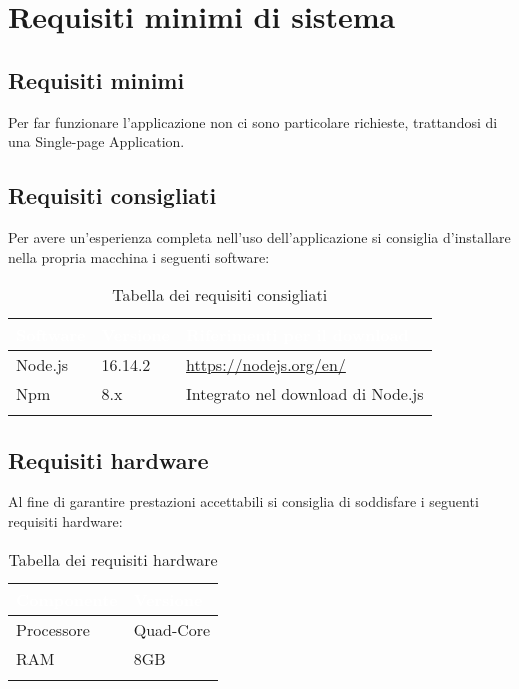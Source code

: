\chapter{Requisiti minimi di sistema}
\section{Requisiti minimi}
    Per far funzionare l'applicazione non ci sono particolare richieste, trattandosi di una Single-page Application.

\section{Requisiti consigliati}
    Per avere un'esperienza completa nell'uso dell'applicazione si consiglia d'installare nella propria macchina i seguenti software:
    \begin{longtable}{|p{2cm}|p{2cm}|p{6cm}|}
        \hline
        \rowcolor[HTML]{036400}
        \textcolor{white}{\textbf{Software}} & \textcolor{white}{\textbf{Versione}} & \textcolor{white}{\textbf{Riferimenti per il download}} \\ \hline
            \rowcolor[HTML]{EFEFEF}
            Node.js & 16.14.2 & \href{https://nodejs.org/en/}{https://nodejs.org/en/}  \\ \hline
            \rowcolor[HTML]{C0C0C0}
            Npm & 8.x & Integrato nel download di Node.js \\ \hline
            \caption{Tabella dei requisiti consigliati}
    \end{longtable}

\section{Requisiti hardware}
    Al fine di garantire prestazioni accettabili si consiglia di soddisfare i seguenti requisiti hardware:
    \begin{longtable}{|p{3cm}|p{3cm}|}
        \hline
        \rowcolor[HTML]{036400}
        \textcolor{white}{\textbf{Componente}} & \textcolor{white}{\textbf{Versione}} \\ \hline
            \rowcolor[HTML]{EFEFEF}
            Processore & Quad-Core \\ \hline
            \rowcolor[HTML]{C0C0C0}
            RAM & 8GB \\ \hline
            \caption{Tabella dei requisiti hardware}
    \end{longtable}
    
